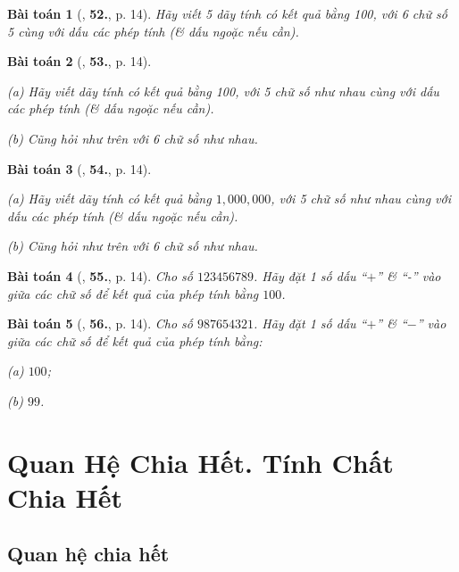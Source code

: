 \documentclass[oneside]{book}
\numberwithin{equation}{section}
\newtheorem{baitoan}{Bài toán}[section]
\begin{document}
\begin{baitoan}[\cite{Binh_Toan_6_tap_1}, \textbf{52.}, p. 14]
	Hãy viết 5 dãy tính có kết quả bằng 100, với 6 chữ số 5 cùng với dấu các phép  tính (\& dấu ngoặc nếu cần).
\end{baitoan}

\begin{baitoan}[\cite{Binh_Toan_6_tap_1}, \textbf{53.}, p. 14]
	\begin{enumerate*}
		\item[(a)] Hãy viết dãy tính có kết quả bằng 100, với 5 chữ số như nhau cùng với dấu các phép tính (\& dấu ngoặc nếu cần).
		\item[(b)] Cũng hỏi như trên với 6 chữ số như nhau.
	\end{enumerate*}
\end{baitoan}

\begin{baitoan}[\cite{Binh_Toan_6_tap_1}, \textbf{54.}, p. 14]
	\begin{enumerate*}
		\item[(a)] Hãy viết dãy tính có kết quả bằng $1,000,000$, với 5 chữ số như nhau cùng với dấu các phép tính (\& dấu ngoặc nếu cần).
		\item[(b)] Cũng hỏi như trên với 6 chữ số như nhau.
	\end{enumerate*}
\end{baitoan}

\begin{baitoan}[\cite{Binh_Toan_6_tap_1}, \textbf{55.}, p. 14]
	 Cho số $123456789$. Hãy đặt 1 số dấu ``$+$'' \& ``-'' vào giữa các chữ số để kết quả của phép tính bằng $100$.
\end{baitoan}

\begin{baitoan}[\cite{Binh_Toan_6_tap_1}, \textbf{56.}, p. 14]
	Cho số $987654321$. Hãy đặt 1 số dấu ``$+$'' \& ``$-$'' vào giữa các chữ số để kết quả của phép tính bằng:
	\begin{enumerate*}
		\item[(a)] $100$;
		\item[(b)] $99$.
	\end{enumerate*}
\end{baitoan}

\section{Quan Hệ Chia Hết. Tính Chất Chia Hết}

\subsection{Quan hệ chia hết}
\end{document}
